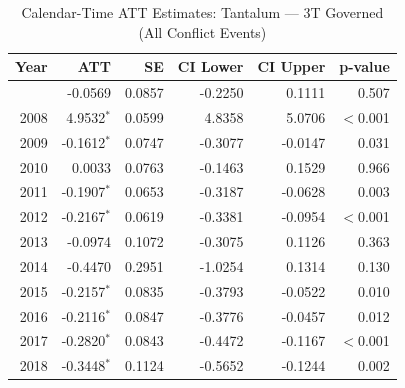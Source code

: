 \begin{longtable}{rrrrrr}
\caption{Calendar-Time ATT Estimates: Tantalum --- 3T Governed (All Conflict Events)} \label{tab:cal_tantalum} \\
\toprule
\textbf{Year} & \textbf{ATT} & \textbf{SE} & \textbf{CI Lower} & \textbf{CI Upper} & \textbf{p-value} \\
\midrule
\endfirsthead
\bottomrule
\endlastfoot
2007 & -0.0569 & 0.0857 & -0.2250 & 0.1111 & 0.507 \\
2008 & 4.9532$^{*}$ & 0.0599 & 4.8358 & 5.0706 & $<$0.001 \\
2009 & -0.1612$^{*}$ & 0.0747 & -0.3077 & -0.0147 & 0.031 \\
2010 & 0.0033 & 0.0763 & -0.1463 & 0.1529 & 0.966 \\
2011 & -0.1907$^{*}$ & 0.0653 & -0.3187 & -0.0628 & 0.003 \\
2012 & -0.2167$^{*}$ & 0.0619 & -0.3381 & -0.0954 & $<$0.001 \\
2013 & -0.0974 & 0.1072 & -0.3075 & 0.1126 & 0.363 \\
2014 & -0.4470 & 0.2951 & -1.0254 & 0.1314 & 0.130 \\
2015 & -0.2157$^{*}$ & 0.0835 & -0.3793 & -0.0522 & 0.010 \\
2016 & -0.2116$^{*}$ & 0.0847 & -0.3776 & -0.0457 & 0.012 \\
2017 & -0.2820$^{*}$ & 0.0843 & -0.4472 & -0.1167 & $<$0.001 \\
2018 & -0.3448$^{*}$ & 0.1124 & -0.5652 & -0.1244 & 0.002 \\
\end{longtable}
